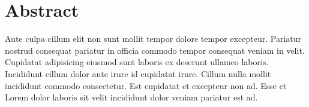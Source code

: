 \chapter*{Abstract}

Aute culpa cillum elit non sunt mollit tempor dolore tempor excepteur. Pariatur
nostrud consequat pariatur in officia commodo tempor consequat veniam in velit.
Cupidatat adipisicing eiusmod sunt laboris ex deserunt ullamco laboris. Incididunt
cillum dolor aute irure id cupidatat irure. Cillum nulla mollit incididunt commodo
consectetur. Est cupidatat et excepteur non ad. Esse et Lorem dolor laboris sit velit
incididunt dolor veniam pariatur est ad.
